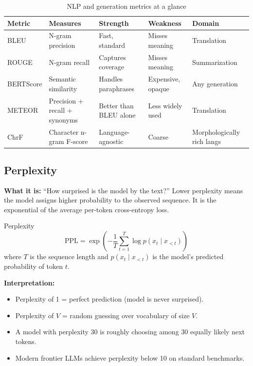\begin{table}[H]
\centering
\caption{NLP and generation metrics at a glance}
\begin{tabularx}{\textwidth}{lXXXl}
\toprule
\textbf{Metric} & \textbf{Measures} & \textbf{Strength} & \textbf{Weakness} & \textbf{Domain} \\
\midrule
BLEU & N-gram precision & Fast, standard & Misses meaning & Translation \\
ROUGE & N-gram recall & Captures coverage & Misses meaning & Summarization \\
BERTScore & Semantic similarity & Handles paraphrases & Expensive, opaque & Any generation \\
METEOR & Precision + recall + synonyms & Better than BLEU alone & Less widely used & Translation \\
ChrF & Character n-gram F-score & Language-agnostic & Coarse & Morphologically rich langs \\
\bottomrule
\end{tabularx}
\end{table}

\subsection{Perplexity}

\textbf{What it is:} ``How surprised is the model by the text?'' Lower perplexity means the model assigns higher probability to the observed sequence. It is the exponential of the average per-token cross-entropy loss.

\begin{mathresult}{Perplexity}
\[
\text{PPL} = \exp\left(-\frac{1}{T}\sum_{t=1}^{T}\log p(x_t \mid x_{<t})\right)
\]
where $T$ is the sequence length and $p(x_t \mid x_{<t})$ is the model's predicted probability of token $t$.
\end{mathresult}

\textbf{Interpretation:}
\begin{itemize}
    \item Perplexity of 1 = perfect prediction (model is never surprised).
    \item Perplexity of $V$ = random guessing over vocabulary of size $V$.
    \item A model with perplexity 30 is roughly choosing among 30 equally likely next tokens.
    \item Modern frontier LLMs achieve perplexity below 10 on standard benchmarks.
\end{itemize}

